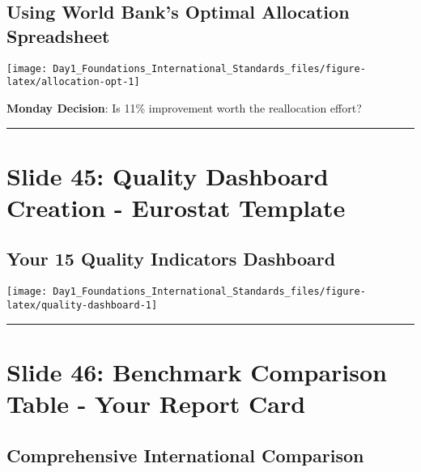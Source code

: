 \documentclass[
]{article}
\begin{document}
\subsection{Using World Bank's Optimal Allocation
Spreadsheet}\label{using-world-banks-optimal-allocation-spreadsheet}

\texttt{[image: Day1\_Foundations\_International\_Standards\_files/figure-latex/allocation-opt-1]}

\textbf{Monday Decision}: Is 11\% improvement worth the reallocation
effort?

\begin{center}\rule{0.5\linewidth}{0.5pt}\end{center}

\section{Slide 45: Quality Dashboard Creation - Eurostat
Template}\label{slide-45-quality-dashboard-creation---eurostat-template}

\subsection{Your 15 Quality Indicators
Dashboard}\label{your-15-quality-indicators-dashboard}

\texttt{[image: Day1\_Foundations\_International\_Standards\_files/figure-latex/quality-dashboard-1]}

\begin{center}\rule{0.5\linewidth}{0.5pt}\end{center}

\section{Slide 46: Benchmark Comparison Table - Your Report
Card}\label{slide-46-benchmark-comparison-table---your-report-card}

\subsection{Comprehensive International
Comparison}\label{comprehensive-international-comparison}
\end{document}
